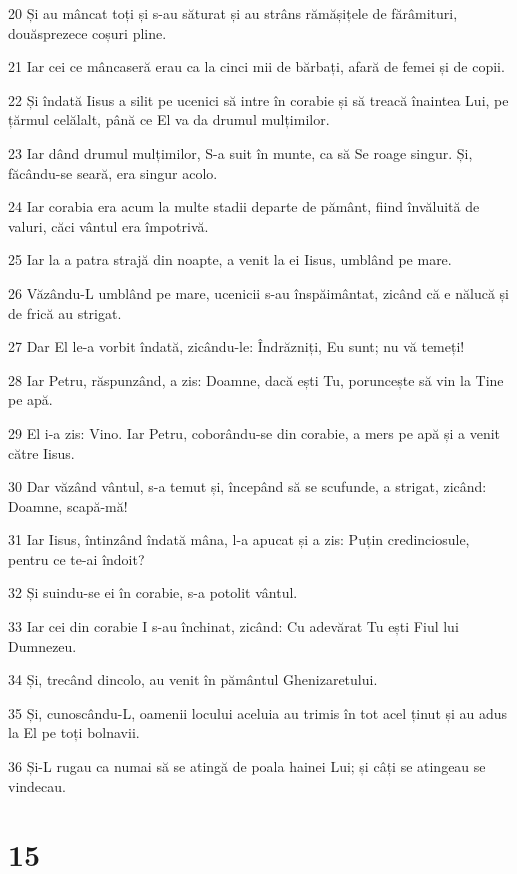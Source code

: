 \par 20 Și au mâncat toți și s-au săturat și au strâns rămășițele de fărâmituri, douăsprezece coșuri pline.
\par 21 Iar cei ce mâncaseră erau ca la cinci mii de bărbați, afară de femei și de copii.
\par 22 Și îndată Iisus a silit pe ucenici să intre în corabie și să treacă înaintea Lui, pe țărmul celălalt, până ce El va da drumul mulțimilor.
\par 23 Iar dând drumul mulțimilor, S-a suit în munte, ca să Se roage singur. Și, făcându-se seară, era singur acolo.
\par 24 Iar corabia era acum la multe stadii departe de pământ, fiind învăluită de valuri, căci vântul era împotrivă.
\par 25 Iar la a patra strajă din noapte, a venit la ei Iisus, umblând pe mare.
\par 26 Văzându-L umblând pe mare, ucenicii s-au înspăimântat, zicând că e nălucă și de frică au strigat.
\par 27 Dar El le-a vorbit îndată, zicându-le: Îndrăzniți, Eu sunt; nu vă temeți!
\par 28 Iar Petru, răspunzând, a zis: Doamne, dacă ești Tu, poruncește să vin la Tine pe apă.
\par 29 El i-a zis: Vino. Iar Petru, coborându-se din corabie, a mers pe apă și a venit către Iisus.
\par 30 Dar văzând vântul, s-a temut și, începând să se scufunde, a strigat, zicând: Doamne, scapă-mă!
\par 31 Iar Iisus, întinzând îndată mâna, l-a apucat și a zis: Puțin credinciosule, pentru ce te-ai îndoit?
\par 32 Și suindu-se ei în corabie, s-a potolit vântul.
\par 33 Iar cei din corabie I s-au închinat, zicând: Cu adevărat Tu ești Fiul lui Dumnezeu.
\par 34 Și, trecând dincolo, au venit în pământul Ghenizaretului.
\par 35 Și, cunoscându-L, oamenii locului aceluia au trimis în tot acel ținut și au adus la El pe toți bolnavii.
\par 36 Și-L rugau ca numai să se atingă de poala hainei Lui; și câți se atingeau se vindecau.

\chapter{15}

